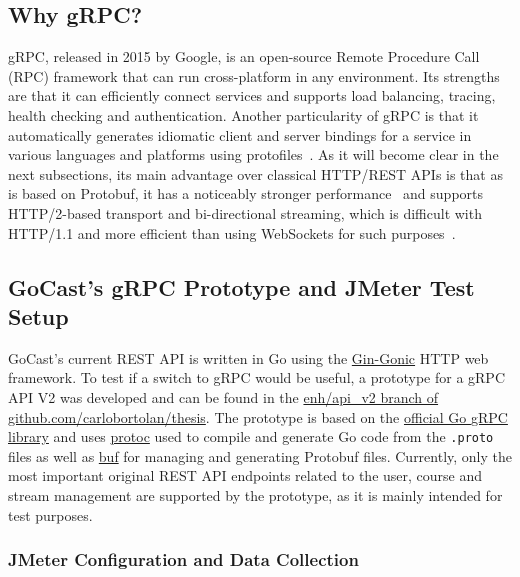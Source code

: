 \subsection{Why gRPC?}

\ac{gRPC}, released in 2015 by Google, is an open-source Remote Procedure Call (RPC) framework that can run cross-platform in any environment. Its strengths are that it can efficiently connect services and supports load balancing, tracing, health checking and authentication.
Another particularity of \ac{gRPC} is that it automatically generates idiomatic client and server bindings for a service in various languages and platforms using protofiles~\parencite{grpc_vs_rest}.
As it will become clear in the next subsections, its main advantage over classical HTTP/\ac{REST} \ac{API}s is that as is based on \ac{Protobuf}, it has a noticeably stronger performance~\parencite{grpc_vs_rest_2} and supports HTTP/2-based transport and bi-directional streaming, which is difficult with HTTP/1.1 and more efficient than using WebSockets for such purposes~\parencite{grpc_dev}.

\subsection{GoCast's gRPC Prototype and JMeter Test Setup}

GoCast's current \ac{REST} \ac{API} is written in Go using the \href{https://github.com/gin-gonic/gin}{Gin-Gonic} HTTP web framework. To test if a switch to \ac{gRPC} would be useful, a prototype for a \ac{gRPC} \ac{API} V2 was developed and can be found in the \href{https://github.com/carlobortolan/thesis/tree/enh/api\_v2}{enh/api\_v2 branch of github.com/carlobortolan/thesis}.
The prototype is based on the \href{https://google.golang.org/gprc}{official Go \ac{gRPC} library} and uses \href{https://github.com/protocolbuffers/protobuf}{protoc} used to compile and generate Go code from the \texttt{.proto} files as well as \href{https://github.com/bufbuild/buf}{buf} for managing and generating \ac{Protobuf} files. Currently, only the most important original \ac{REST} \ac{API} endpoints related to the user, course and stream management are supported by the prototype, as it is mainly intended for test purposes.

\subsubsection{JMeter Configuration and Data Collection}

